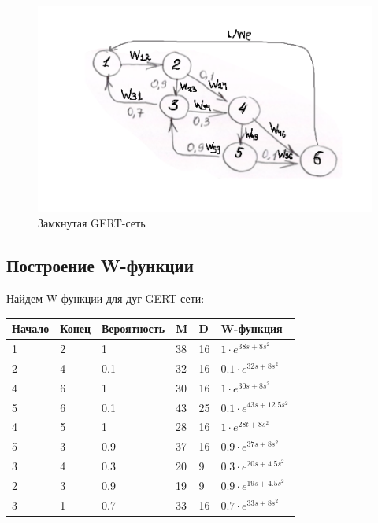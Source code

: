 \documentclass[14pt,a4paper,report]{report}
\begin{document}
\begin{figure}[h!]
	\centering
	\includegraphics[scale = 0.65]{images/1.png}
	\caption{Замкнутая GERT-сеть}
	\label{image:1}
\end{figure}

\subsection{Построение W-функции}

Найдем W-функции для дуг GERT-сети:

\begin{table}[h!]
	\bgroup
	\def\arraystretch{1}
	\begin{tabular}{ | m{1.5cm} | m{1.5cm} | m{2.0cm} | m{1.0cm} | m{1.0cm} | m{3.0cm} | }
		\hline
		Начало & Конец & Вероятность & M & D & W-функция \\ \hline
		1 &  2 & 1 		& 38 & 16 & $1\cdot e^{38s+8s^2}$ \\ \hline
		2 & 4 & 0.1  & 32 & 16 & $0.1\cdot e^{32s+8s^2}$ \\ \hline
		4 & 6 & 1 		& 30 & 16 & $1\cdot e^{30s+8s^2}$ \\ \hline
		5 & 6 & 0.1 	& 43 & 25 & $0.1\cdot e^{43s+12.5s^2}$ \\ \hline
		4 & 5 & 1 		& 28 & 16 & $1\cdot e^{28t+8s^2}$ \\ \hline
		5 & 3 & 0.9 	& 37 & 16 & $0.9\cdot e^{37s+8s^2}$ \\ \hline
		3 & 4 & 0.3 	& 20 & 9 & $0.3\cdot e^{20s+4.5s^2}$ \\ \hline
		2 & 3 & 0.9 	& 19 & 9 & $0.9\cdot e^{19s+4.5s^2}$ \\ \hline
		3 & 1 & 0.7 	& 33 & 16 & $0.7\cdot e^{33s+8s^2}$ \\ \hline
	\end{tabular}
	\egroup
\end{table}
\end{document}
